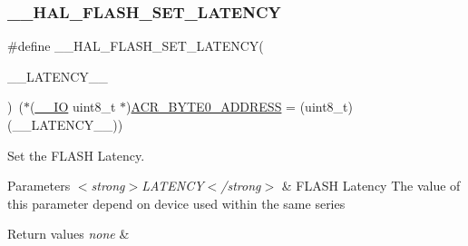 \subsubsection{\texorpdfstring{\+\_\+\+\_\+\+H\+A\+L\+\_\+\+F\+L\+A\+S\+H\+\_\+\+S\+E\+T\+\_\+\+L\+A\+T\+E\+N\+CY}{\_\_HAL\_FLASH\_SET\_LATENCY}}
{\footnotesize\ttfamily \#define \+\_\+\+\_\+\+H\+A\+L\+\_\+\+F\+L\+A\+S\+H\+\_\+\+S\+E\+T\+\_\+\+L\+A\+T\+E\+N\+CY(\begin{DoxyParamCaption}\item[{}]{\+\_\+\+\_\+\+L\+A\+T\+E\+N\+C\+Y\+\_\+\+\_\+ }\end{DoxyParamCaption})~($\ast$(\hyperlink{core__sc300_8h_aec43007d9998a0a0e01faede4133d6be}{\+\_\+\+\_\+\+IO} uint8\+\_\+t $\ast$)\hyperlink{group___f_l_a_s_h___private___constants_gaeaca61fbcff69df08100280868bff214}{A\+C\+R\+\_\+\+B\+Y\+T\+E0\+\_\+\+A\+D\+D\+R\+E\+SS} = (uint8\+\_\+t)(\+\_\+\+\_\+\+L\+A\+T\+E\+N\+C\+Y\+\_\+\+\_\+))}



Set the F\+L\+A\+SH Latency. 


\begin{DoxyParams}{Parameters}
{\em $<$strong$>$\+L\+A\+T\+E\+N\+C\+Y$<$/strong$>$} & F\+L\+A\+SH Latency The value of this parameter depend on device used within the same series \\
\hline
\end{DoxyParams}

\begin{DoxyRetVals}{Return values}
{\em none} & \\
\hline
\end{DoxyRetVals}
